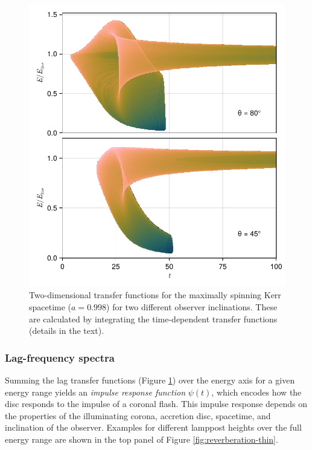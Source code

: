 \documentclass[fleqn,usenatbib]{mnras}
\begin{document}
\begin{figure}
	\centering
	\includegraphics[width=0.97\linewidth]{figures/transfer-functions.2d.pdf}
    \caption{Two-dimensional transfer functions for the maximally spinning Kerr
    spacetime ($a = 0.998$) for two different observer inclinations. These are
    calculated by integrating the time-dependent transfer functions (details in
the text).}
	\label{fig:lag-frequency-transfer-functions}
\end{figure}

\subsubsection{Lag-frequency spectra}


Summing the lag transfer functions (Figure
\ref{fig:lag-frequency-transfer-functions}) over the energy axis for a given
energy range yields an \textit{impulse response function} $\psi(t)$, which
encodes how the disc responds to the impulse of a coronal flash. This impulse
response depends on the properties of the illuminating corona, accretion disc,
spacetime, and inclination of the observer. Examples for different lamppost
heights over the full energy range are shown in the top panel of Figure
\ref{fig:reverberation-thin}.
\end{document}
